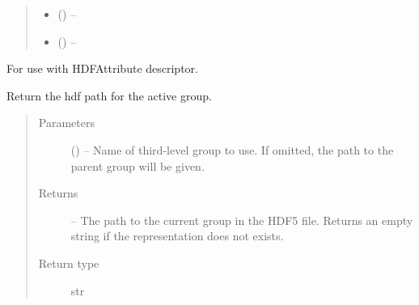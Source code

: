 \documentclass[letterpaper,10pt,english]{sphinxmanual}
\begin{document}
\begin{fulllineitems}
\begin{fulllineitems}
\begin{quote}
\begin{description}
\begin{itemize}
\item {} 
\sphinxstyleliteralstrong{, } () -- 

\item {} 
\sphinxstyleliteralstrong{, } () -- 

\end{itemize}

\end{description}\end{quote}

\end{fulllineitems}


\begin{fulllineitems}
\label{\detokenize{xanespy:xanespy.xanes_frameset.XanesFrameset.hdf_node}}
For use with HDFAttribute descriptor.

\end{fulllineitems}


\begin{fulllineitems}
\label{\detokenize{xanespy:xanespy.xanes_frameset.XanesFrameset.hdf_path}}
Return the hdf path for the active group.
\begin{quote}\begin{description}
\item[{Parameters}] \leavevmode
{} (\sphinxstyleliteralemphasis{, }) -- Name of third-level group to use. If omitted, the path to
the parent group will be given.

\item[{Returns}] \leavevmode
{} -- The path to the current group in the HDF5 file. Returns an
empty string if the representation does not exists.

\item[{Return type}] \leavevmode
str

\end{description}\end{quote}


\end{fulllineitems}
\end{fulllineitems}
\end{document}
